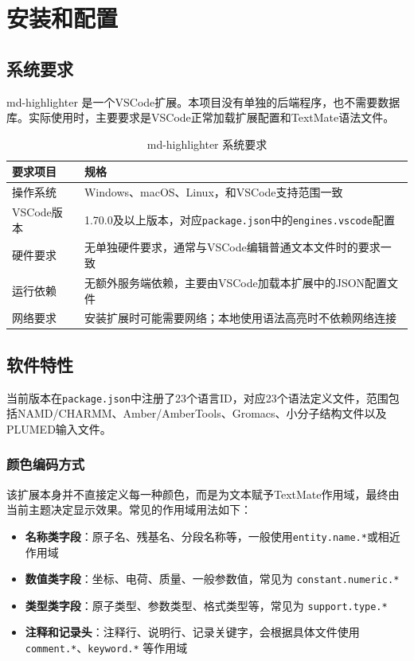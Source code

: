 
\section{安装和配置}

\subsection{系统要求}

md-highlighter 是一个VSCode扩展。本项目没有单独的后端程序，也不需要数据库。实际使用时，主要要求是VSCode正常加载扩展配置和TextMate语法文件。

\begin{table}[h]
\centering
\caption{md-highlighter 系统要求}
\begin{tabular}{p{3cm}p{10cm}}
\toprule
\textbf{要求项目} & \textbf{规格} \\
\midrule
操作系统 & Windows、macOS、Linux，和VSCode支持范围一致 \\
VSCode版本 & 1.70.0及以上版本，对应\lstinline|package.json|中的\lstinline|engines.vscode|配置 \\
硬件要求 & 无单独硬件要求，通常与VSCode编辑普通文本文件时的要求一致 \\
运行依赖 & 无额外服务端依赖，主要由VSCode加载本扩展中的JSON配置文件 \\
网络要求 & 安装扩展时可能需要网络；本地使用语法高亮时不依赖网络连接 \\
\bottomrule
\end{tabular}
\end{table}

\subsection{软件特性}

当前版本在\lstinline|package.json|中注册了23个语言ID，对应23个语法定义文件，范围包括NAMD/CHARMM、Amber/AmberTools、Gromacs、小分子结构文件以及PLUMED输入文件。

\subsubsection{颜色编码方式}

该扩展本身并不直接定义每一种颜色，而是为文本赋予TextMate作用域，最终由当前主题决定显示效果。常见的作用域用法如下：

\begin{itemize}
    \item \textbf{名称类字段}：原子名、残基名、分段名称等，一般使用\lstinline|entity.name.*|或相近作用域
    \item \textbf{数值类字段}：坐标、电荷、质量、一般参数值，常见为 \lstinline|constant.numeric.*|
    \item \textbf{类型类字段}：原子类型、参数类型、格式类型等，常见为 \lstinline|support.type.*|
    \item \textbf{注释和记录头}：注释行、说明行、记录关键字，会根据具体文件使用 \lstinline|comment.*|、\lstinline|keyword.*| 等作用域
\end{itemize}

